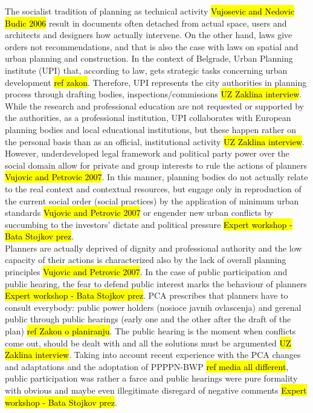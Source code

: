 \documentclass[11pt]{report}
\begin{document}
The socialist tradition of planning as technical activity \hl{Vujosevic and Nedovic Budic 2006} result in documents often detached from actual space, users and architects and designers how actually intervene.
On the other hand, laws give orders not recommendations, and 
that is also the case with laws on spatial and urban planning and construction.
In the context of Belgrade, Urban Planning institute (UPI) that, according to law, gets strategic tasks concerning urban development \hl{ref zakon}.
Therefore, UPI represents the city authorities in planning process through drafting bodies, inspections/commissions \hl{UZ Zaklina interview}.
While the research and professional education are not requested or supported by the authorities, as a professional institution, UPI collaborates with European planning bodies and local educational institutions, but these happen rather on the personal basis than as an official, institutional activity \hl{UZ Zaklina interview}.
\\
However, underdeveloped legal framework and political party power over the social domain allow for private and group interests to rule the actions of planners \hl{Vujovic and Petrovic 2007}.
In this manner, planning bodies do not actually relate to the real context and contextual resources, but engage only in reproduction of the current social order (social practices) by the application of minimum urban standards \hl{Vujovic and Petrovic 2007} or engender new urban conflicts by succumbing to the investors' dictate and political pressure \hl{Expert workshop - Bata Stojkov prez}.
\\
Planners are  actually deprived of dignity and professional authority and the low capacity of their actions is characterized also by the lack of overall planning principles  \hl{Vujovic and Petrovic 2007}.
In the case of public participation and public hearing, the fear to defend public interest marks the behaviour of planners \hl{Expert workshop - Bata Stojkov prez}.
PCA prescribes that planners have to consult everybody: public power holders (nosioce javnih ovlascenja) and gerenal public through public hearings (early one and the other after the draft of the plan) \hl{ref Zakon o planiranju}.
The public hearing is the moment when conflicts come out, should be dealt with and all the solutions must be argumented \hl{UZ Zaklina interview}.
Taking into account recent experience with the PCA changes and adaptations and the adoptation of PPPPN-BWP \hl{ref media all different}, public participation was rather a farce and public hearings were pure formality with obvious and maybe even illegitimate disregard of negative comments \hl{Expert workshop - Bata Stojkov prez}.
\end{document}
